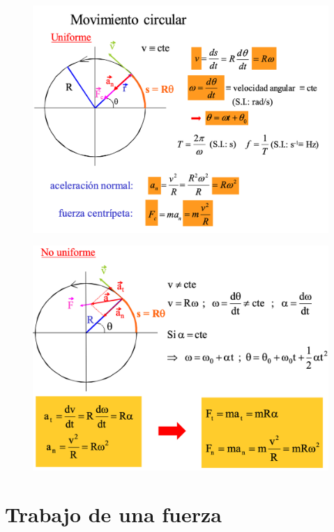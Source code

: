 \newpage %

\begin{figure}[H]
		\centering
		\includegraphics[width=.95\textwidth]{imagenes/imagenes02/T02IM31.png}
		\end{figure}

\begin{figure}[H]
		\centering
		\includegraphics[width=.95\textwidth]{imagenes/imagenes02/T02IM32.png}
		\end{figure}

			
\section{Trabajo de una fuerza}


